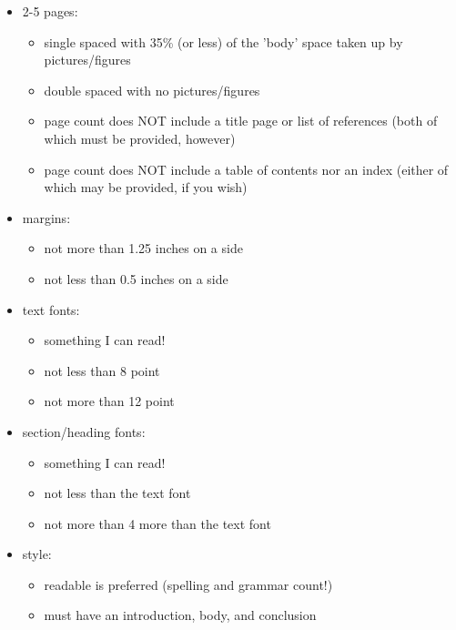 \documentclass{template}
\begin{document}
\begin{itemize}
\item 2-5 pages:
  \begin{itemize}
  \item single spaced with 35\% (or less) of the 'body' space taken up by pictures/figures
  \item double spaced with no pictures/figures
  \item page count does NOT include a title page or list of references (both of which must be provided, however)
  \item page count does NOT include a table of contents nor an index (either of which may be provided, if you wish)
  \end{itemize}
\item margins:
    \begin{itemize}
    \item not more than 1.25 inches on a side
    \item not less than 0.5 inches on a side
    \end{itemize}
\item text fonts:
  \begin{itemize}
  \item something I can read!
  \item not less than 8 point
  \item not more than 12 point
  \end{itemize}
\item section/heading fonts:
  \begin{itemize}
  \item something I can read!
  \item not less than the text font
  \item not more than 4 more than the text font
  \end{itemize}
\item style:
  \begin{itemize}
  \item readable is preferred (spelling and grammar count!)
  \item must have an introduction, body, and conclusion
  \end{itemize}
\end{itemize}
\newpage


\newpage

\end{document}
